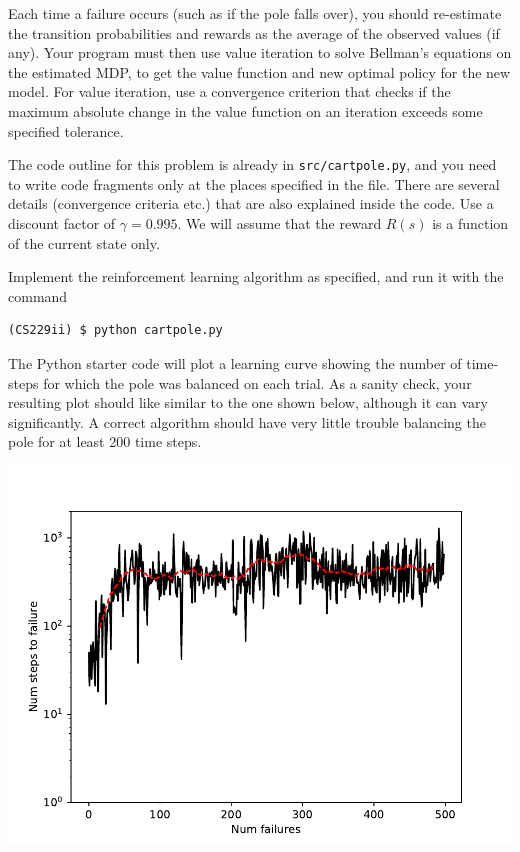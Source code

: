 Each time a failure occurs (such as if the pole falls over), you should 
re-estimate the transition probabilities and rewards as the average of 
the observed values (if any).  Your program must then use value iteration 
to solve Bellman's equations on the estimated MDP, to get the value function 
and new optimal policy for the new model.  For value iteration, use a 
convergence criterion that checks if the maximum absolute change in the 
value function on an iteration exceeds some specified tolerance. 

The code outline for this problem is already in 
{\tt src/cartpole.py}, and you need to write code fragments only at the
places specified in the file. There are several details (convergence criteria
etc.) that are also explained inside the code. Use a discount factor
of $\gamma = 0.995$.  We will assume that the reward $R(s)$ is a function of
the current state only.

Implement the reinforcement learning algorithm as specified, and run it with the command
\begin{lstlisting}
(CS229ii) $ python cartpole.py
\end{lstlisting}

The Python starter code will plot a learning curve showing the number of time-steps for which the pole was balanced on each trial. As a sanity check, your resulting plot should like similar to the one shown below, although it can vary significantly.  A correct algorithm should have very little trouble balancing the pole for at least 200 time steps.

\begin{center}
  \includegraphics[scale=0.75]{cartpole/control}
\end{center}
